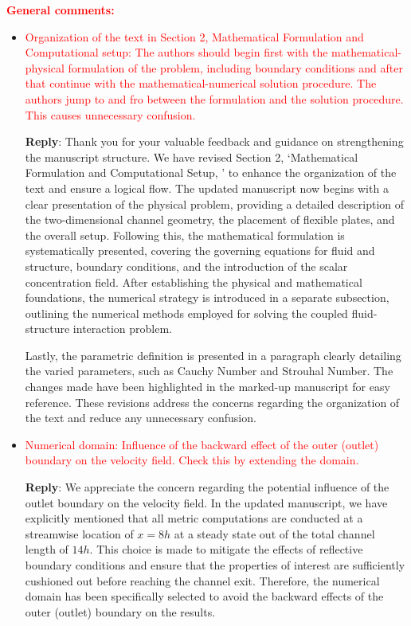 \documentclass[onecolumn,a4paper,amsmath,amssym,pre]{revtex4}
\begin{document}
				\textcolor{red}{\textbf{General comments:}}\\
				\begin{itemize}
					\item \textcolor{red}{Organization of the text in Section 2, Mathematical Formulation and Computational setup: The authors should begin first with the mathematical-physical formulation of the problem, including boundary conditions and after that continue with the mathematical-numerical solution procedure. The authors jump to and fro between the formulation and the solution procedure. This causes unnecessary confusion.
					}
					
					\textbf{Reply}: Thank you for your valuable feedback and guidance on strengthening the manuscript structure. We have revised Section 2, `Mathematical Formulation and Computational Setup, ' to enhance the organization of the text and ensure a logical flow. The updated manuscript now begins with a clear presentation of the physical problem, providing a detailed description of the two-dimensional channel geometry, the placement of flexible plates, and the overall setup. Following this, the mathematical formulation is systematically presented, covering the governing equations for fluid and structure, boundary conditions, and the introduction of the scalar concentration field.
					After establishing the physical and mathematical foundations, the numerical strategy is introduced in a separate subsection, outlining the numerical methods employed for solving the coupled fluid-structure interaction problem.
					
					Lastly, the parametric definition is presented in a paragraph clearly detailing the varied parameters, such as Cauchy Number and Strouhal Number. The changes made have been highlighted in the marked-up manuscript for easy reference. These revisions address the concerns regarding the organization of the text and reduce any unnecessary confusion.
					
					\item \textcolor{red}{Numerical domain: Influence of the backward effect of the outer (outlet) boundary on the velocity field. Check this by extending the domain.}
					
					\textbf{Reply}: We appreciate the concern regarding the potential influence of the outlet boundary on the velocity field. In the updated manuscript, we have explicitly mentioned that all metric computations are conducted at a streamwise location of $x=8h$ at a steady state out of the total channel length of $14h$. This choice is made to mitigate the effects of reflective boundary conditions and ensure that the properties of interest are sufficiently cushioned out before reaching the channel exit. Therefore, the numerical domain has been specifically selected to avoid the backward effects of the outer (outlet) boundary on the results.
					\\
				\end{itemize}
				
\end{document}
